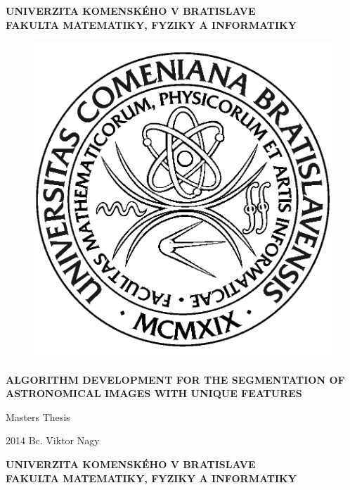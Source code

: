 \documentclass[12pt, a4paper, oneside]{book}
\newcommand\mftitle{Algorithm development for the segmentation of astronomical images with unique features}
\newcommand\mfthesistype{Masters Thesis}
\newcommand\mfauthor{Bc. Viktor Nagy}
\newcommand\mfuniversity{UNIVERZITA KOMENSKÉHO V BRATISLAVE}
\newcommand\mffaculty{FAKULTA MATEMATIKY, FYZIKY A INFORMATIKY}
\begin{document}
\frontmatter

\thispagestyle{empty}

\noindent
\begin{minipage}{\textwidth}
\begin{center}
\textbf{\mfuniversity \\
\mffaculty}
\end{center}
\end{minipage}

\vfill
\begin{figure}[!hbt]
	\begin{center}
		\includegraphics{images/logo_fmph}
		\label{img:logo}
	\end{center}
\end{figure}
\begin{center}
	\begin{minipage}{0.8\textwidth}
		\centerline{\textbf{\Large\MakeUppercase{\mftitle}}}
		\smallskip
		\centerline{\mfthesistype}
	\end{minipage}
\end{center}
\vfill
2014 \hfill
\mfauthor
\eject 

\thispagestyle{empty}

\noindent
\begin{minipage}{\textwidth}
\begin{center}
\textbf{\mfuniversity \\
\mffaculty}
\end{center}
\end{minipage}
\end{document}
